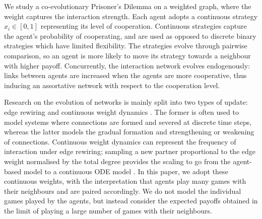 \documentclass[10pt]{article}
\begin{document}
We study a co-evolutionary Prisoner's Dilemma on a weighted graph, where the weight captures the interaction strength. Each agent adopts a continuous strategy $x_i \in [0,1]$ representing its level of cooperation. Continuous strategies capture the agent's probability of cooperating, and are used as opposed to discrete binary strategies which have limited flexibility. The strategies evolve through pairwise comparison, so an agent is more likely to move its strategy towards a neighbour with higher payoff. Concurrently, the interaction network evolves endogenously: links between agents are increased when the agents are more cooperative, thus inducing an assortative network with respect to the cooperation level.

Research on the evolution of networks is mainly split into two types of update: edge rewiring \cite{zheng_simple_2017, defection_russell2026, izquierdo_leave_2014} and continuous weight dynamics \cite{bara_enabling_2022, nugent_evolving_2023, nugent2026emergent,gkogkas2021continuum,ayi2021mean}. The former is often used to model systems where connections are formed and severed at discrete time steps, whereas the latter models the gradual formation and strengthening or weakening of connections. Continuous weight dynamics can represent the frequency of interaction under edge rewiring; sampling a new partner proportional to the edge weight normalised by the total degree provides the scaling to go from the agent-based model to a continuous ODE model \cite{nugent2024bridging}. In this paper, we adopt these continuous weights, with the interpretation that agents play many games with their neighbours and are paired accordingly. We do not model the individual games played by the agents, but instead consider the expected payoffs obtained in the limit of playing a large number of games with their neighbours. 
\end{document}

